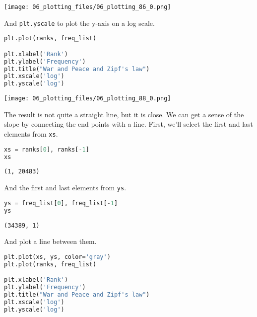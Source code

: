 \begin{center}
\texttt{[image: 06\_plotting\_files/06\_plotting\_86\_0.png]}
\end{center}

And \passthrough{\lstinline!plt.yscale!} to plot the y-axis on a log
scale.

\begin{lstlisting}[language=Python,style=source]
plt.plot(ranks, freq_list)

plt.xlabel('Rank')
plt.ylabel('Frequency')
plt.title("War and Peace and Zipf's law")
plt.xscale('log')
plt.yscale('log')
\end{lstlisting}

\begin{center}
\texttt{[image: 06\_plotting\_files/06\_plotting\_88\_0.png]}
\end{center}

The result is not quite a straight line, but it is close. We can get a
sense of the slope by connecting the end points with a line. First,
we'll select the first and last elements from
\passthrough{\lstinline!xs!}.

\begin{lstlisting}[language=Python,style=source]
xs = ranks[0], ranks[-1]
xs
\end{lstlisting}

\begin{lstlisting}[style=output]
(1, 20483)
\end{lstlisting}

And the first and last elements from \passthrough{\lstinline!ys!}.

\begin{lstlisting}[language=Python,style=source]
ys = freq_list[0], freq_list[-1]
ys
\end{lstlisting}

\begin{lstlisting}[style=output]
(34389, 1)
\end{lstlisting}

And plot a line between them.

\begin{lstlisting}[language=Python,style=source]
plt.plot(xs, ys, color='gray')
plt.plot(ranks, freq_list)

plt.xlabel('Rank')
plt.ylabel('Frequency')
plt.title("War and Peace and Zipf's law")
plt.xscale('log')
plt.yscale('log')
\end{lstlisting}

